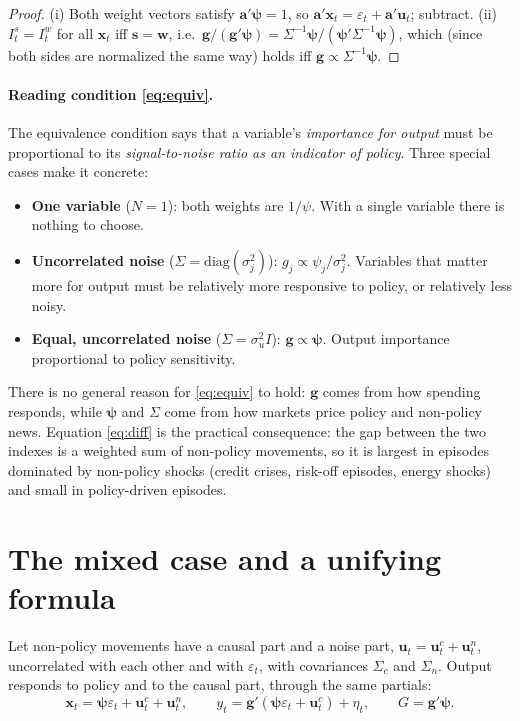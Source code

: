 \documentclass[11pt]{article}
\theoremstyle{definition}
\theoremstyle{remark}
\newcommand{\bpsi}{\boldsymbol{\psi}}
\newcommand{\bx}{\mathbf{x}}
\newcommand{\bu}{\mathbf{u}}
\newcommand{\bg}{\mathbf{g}}
\newcommand{\bs}{\mathbf{s}}
\newcommand{\bw}{\mathbf{w}}
\newcommand{\ba}{\mathbf{a}}
\begin{document}
\begin{proof}
(i) Both weight vectors satisfy $\ba'\bpsi=1$, so $\ba'\bx_t=\varepsilon_t+\ba'\bu_t$; subtract. (ii) $I^s_t=I^w_t$ for all $\bx_t$ iff $\bs=\bw$, i.e.\ $\bg/(\bg'\bpsi)=\Sigma^{-1}\bpsi/(\bpsi'\Sigma^{-1}\bpsi)$, which (since both sides are normalized the same way) holds iff $\bg\propto\Sigma^{-1}\bpsi$.
\end{proof}

\paragraph{Reading condition \eqref{eq:equiv}.} The equivalence condition says that a variable's \emph{importance for output} must be proportional to its \emph{signal-to-noise ratio as an indicator of policy}. Three special cases make it concrete:
\begin{itemize}[leftmargin=2em]
\item \textbf{One variable} ($N=1$): both weights are $1/\psi$. With a single variable there is nothing to choose.
\item \textbf{Uncorrelated noise} ($\Sigma=\mathrm{diag}(\sigma_j^2)$): $g_j \propto \psi_j/\sigma_j^2$. Variables that matter more for output must be relatively more responsive to policy, or relatively less noisy.
\item \textbf{Equal, uncorrelated noise} ($\Sigma=\sigma_u^2 I$): $\bg\propto\bpsi$. Output importance proportional to policy sensitivity.
\end{itemize}
There is no general reason for \eqref{eq:equiv} to hold: $\bg$ comes from how spending responds, while $\bpsi$ and $\Sigma$ come from how markets price policy and non-policy news. Equation \eqref{eq:diff} is the practical consequence: the gap between the two indexes is a weighted sum of non-policy movements, so it is largest in episodes dominated by non-policy shocks (credit crises, risk-off episodes, energy shocks) and small in policy-driven episodes.

\section{The mixed case and a unifying formula}\label{sec:mixed}

Let non-policy movements have a causal part and a noise part, $\bu_t=\bu^c_t+\bu^n_t$, uncorrelated with each other and with $\varepsilon_t$, with covariances $\Sigma_c$ and $\Sigma_n$. Output responds to policy and to the causal part, through the same partials:
\[
\bx_t = \bpsi\varepsilon_t+\bu^c_t+\bu^n_t,\qquad y_t=\bg'(\bpsi\varepsilon_t+\bu^c_t)+\eta_t,\qquad G=\bg'\bpsi .
\]
\end{document}
